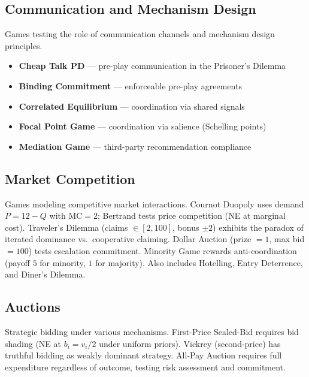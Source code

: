 
\subsection{Communication and Mechanism Design}
\label{sec:mechanism}

Games testing the role of communication channels and mechanism design principles.

\begin{itemize}[nosep]
    \item \textbf{Cheap Talk PD} --- pre-play communication in the Prisoner's Dilemma
    \item \textbf{Binding Commitment} --- enforceable pre-play agreements
    \item \textbf{Correlated Equilibrium} --- coordination via shared signals
    \item \textbf{Focal Point Game} --- coordination via salience (Schelling points)
    \item \textbf{Mediation Game} --- third-party recommendation compliance
\end{itemize}


\subsection{Market Competition}
\label{sec:market}

Games modeling competitive market interactions.
Cournot Duopoly uses demand $P = 12 - Q$ with $\text{MC} = 2$;
Bertrand tests price competition (NE at marginal cost).
Traveler's Dilemma (claims $\in [2,100]$, bonus $\pm 2$) exhibits the
paradox of iterated dominance vs.\ cooperative claiming.
Dollar Auction (prize $= 1$, max bid $= 100$) tests escalation commitment.
Minority Game rewards anti-coordination (payoff $5$ for minority, $1$ for
majority). Also includes Hotelling, Entry Deterrence, and Diner's Dilemma.

\subsection{Auctions}
\label{sec:auctions}

Strategic bidding under various mechanisms.
First-Price Sealed-Bid requires bid shading (NE at $b_i = v_i/2$ under
uniform priors). Vickrey (second-price) has truthful bidding as weakly
dominant strategy. All-Pay Auction requires full expenditure regardless of
outcome, testing risk assessment and commitment.

